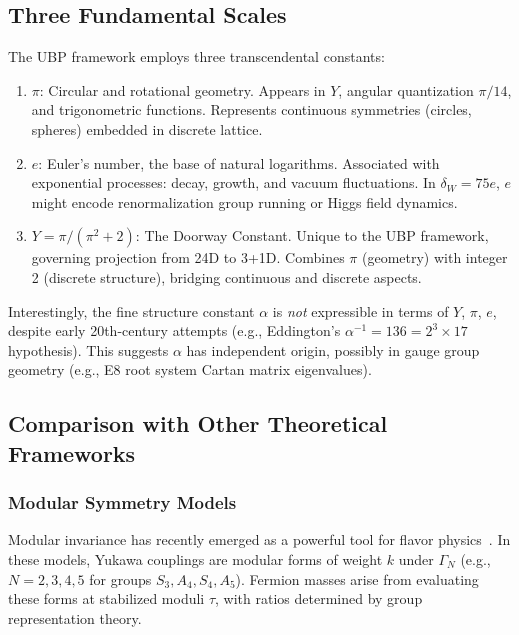 \documentclass[11pt,a4paper]{article}
\begin{document}
\subsection{Three Fundamental Scales}

The UBP framework employs three transcendental constants:
\begin{enumerate}
\item \textbf{$\pi$}: Circular and rotational geometry. Appears in $Y$, angular quantization $\pi/14$, and trigonometric functions. Represents continuous symmetries (circles, spheres) embedded in discrete lattice.

\item \textbf{$e$}: Euler's number, the base of natural logarithms. Associated with exponential processes: decay, growth, and vacuum fluctuations. In $\delta_W = 75e$, $e$ might encode renormalization group running or Higgs field dynamics.

\item \textbf{$Y = \pi/(\pi^2+2)$}: The Doorway Constant. Unique to the UBP framework, governing projection from 24D to 3+1D. Combines $\pi$ (geometry) with integer 2 (discrete structure), bridging continuous and discrete aspects.
\end{enumerate}

Interestingly, the fine structure constant $\alpha$ is \emph{not} expressible in terms of $Y$, $\pi$, $e$, despite early 20th-century attempts (e.g., Eddington's $\alpha^{-1} = 136 = 2^3 \times 17$ hypothesis). This suggests $\alpha$ has independent origin, possibly in gauge group geometry (e.g., E8 root system Cartan matrix eigenvalues).

\subsection{Comparison with Other Theoretical Frameworks}

\subsubsection{Modular Symmetry Models}

Modular invariance has recently emerged as a powerful tool for flavor physics~\cite{ref001,ref006}. In these models, Yukawa couplings are modular forms of weight $k$ under $\Gamma_N$ (e.g., $N=2,3,4,5$ for groups $S_3, A_4, S_4, A_5$). Fermion masses arise from evaluating these forms at stabilized moduli $\tau$, with ratios determined by group representation theory.
\end{document}
